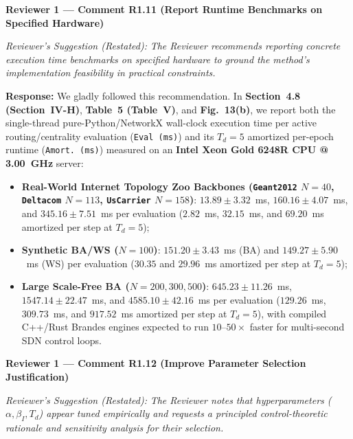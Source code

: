 \documentclass[11pt,a4paper]{article}
\newcommand{\cbox}[2]{%
  \vspace{0.6em}\noindent\textbf{#1}\par\smallskip
  \noindent\textit{Reviewer's Suggestion (Restated):} \textit{#2}\par\smallskip
}
\begin{document}
\hrulefill

\cbox{Reviewer 1 --- Comment R1.11 (Report Runtime Benchmarks on Specified Hardware)}{The Reviewer recommends reporting concrete execution time benchmarks on specified hardware to ground the method's implementation feasibility in practical constraints.}

\noindent\textbf{Response:} We gladly followed this recommendation. In \textbf{Section~4.8 (Section~IV-H)}, \textbf{Table~5 (Table~V)}, and \textbf{Fig.~13(b)}, we report both the single-thread pure-Python/NetworkX wall-clock execution time per active routing/centrality evaluation (\texttt{Eval (ms)}) and its $T_d=5$ amortized per-epoch runtime (\texttt{Amort.\ (ms)}) measured on an \textbf{Intel Xeon Gold 6248R CPU @ 3.00~GHz} server:
\begin{itemize}[leftmargin=1.8em]
    \item \textbf{Real-World Internet Topology Zoo Backbones (\texttt{Geant2012} $N=40$, \texttt{Deltacom} $N=113$, \texttt{UsCarrier} $N=158$)}: $13.89 \pm 3.32$~ms, $160.16 \pm 4.07$~ms, and $345.16 \pm 7.51$~ms per evaluation ($2.82$~ms, $32.15$~ms, and $69.20$~ms amortized per step at $T_d=5$);
    \item \textbf{Synthetic BA/WS ($N=100$)}: $151.20 \pm 3.43$~ms (BA) and $149.27 \pm 5.90$~ms (WS) per evaluation ($30.35$ and $29.96$~ms amortized per step at $T_d=5$);
    \item \textbf{Large Scale-Free BA ($N=200, 300, 500$)}: $645.23 \pm 11.26$~ms, $1547.14 \pm 22.47$~ms, and $4585.10 \pm 42.16$~ms per evaluation ($129.26$~ms, $309.73$~ms, and $917.52$~ms amortized per step at $T_d=5$), with compiled C++/Rust Brandes engines expected to run $10$--$50\times$ faster for multi-second SDN control loops.
\end{itemize}

\hrulefill

\cbox{Reviewer 1 --- Comment R1.12 (Improve Parameter Selection Justification)}{The Reviewer notes that hyperparameters ($\alpha, \beta_I, T_d$) appear tuned empirically and requests a principled control-theoretic rationale and sensitivity analysis for their selection.}
\end{document}
